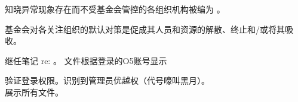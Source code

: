 
\begin{whiteboxbb}

知晓异常现象存在而不受基金会管控的各组织机构被编为 。

基金会对各关注组织的默认对策是促成其人员和资源的解散、终止和/或将其吸收。

\end{whiteboxbb}

继任笔记 re: 。 文件根据登录的O5账号显示


\begin{scpboxc}[colback=dafadnine]

验证登录权限。识别到管理员优越权（代号嚎叫黑月）。\\
展示所有文件。

\end{scpboxc}

